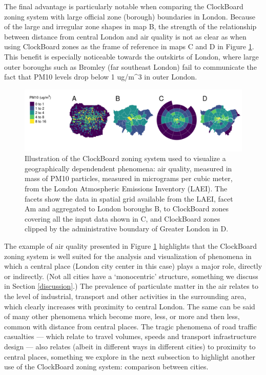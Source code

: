 \documentclass{josis}
\begin{document}
The final advantage is particularly notable when comparing the ClockBoard zoning system with large official zone (borough) boundaries in London.
Because of the large and irregular zone shapes in map B, the strength of the relationship between distance from central London and air quality is not as clear as when using ClockBoard zones as the frame of reference in maps C and D in Figure \ref{fig:cityscale}.
This benefit is especially noticeable towards the outskirts of London, where large outer boroughs such as Bromley (far southeast London) fail to communicate the fact that PM10 levels drop below 1 ug/m\^{}3 in outer London.

\begin{figure}

{\centering \includegraphics[width=1\linewidth]{cityscale} 

}

\caption{Illustration of the ClockBoard zoning system used to visualize a geographically dependendent phenomena: air quality, measured in mass of PM10 particles, measured in micrograms per cubic meter, from the London Atmospheric Emissions Inventory (LAEI). The facets show the data in spatial grid available from the LAEI, facet Am and aggregated to London boroughs B, to ClockBoard zones covering all the input data shown in C, and ClockBoard zones clipped by the administrative boundary of Greater London in D.}\label{fig:cityscale}
\end{figure}

The example of air quality presented in Figure \ref{fig:cityscale} highlights that the ClockBoard zoning system is well suited for the analysis and visualization of phenomena in which a central place (London city center in this case) plays a major role, directly or indirectly.
(Not all cities have a `monocentric' structure, something we discuss in Section \ref{discussion}.)
The prevalence of particulate matter in the air relates to the level of industrial, transport and other activities in the surrounding area, which clearly increases with proximity to central London.
The same can be said of many other phenomena which become more, less, or more and then less, common with distance from central places.
The tragic phenomena of road traffic casualties --- which relate to travel volumes, speeds and transport infrastructure design --- also relates (albeit in different ways in different cities) to proximity to central places, something we explore in the next subsection to highlight another use of the ClockBoard zoning system: comparison between cities.
\end{document}
